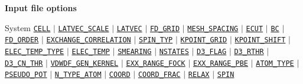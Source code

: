   
  
  \begin{frame}[allowframebreaks]{\textbf{Input file options}} \label{Index}
  \vspace{-2mm}
  \begin{block}{System}
  \hyperlink{CELL}{\texttt{CELL}} $\vert$
  \hyperlink{LATVEC_SCALE}{\texttt{LATVEC\_SCALE}} $\vert$
  \hyperlink{LATVEC}{\texttt{LATVEC}}  $\vert$
  \hyperlink{FD_GRID}{\texttt{FD\_GRID}} $\vert$
  \hyperlink{MESH_SPACING}{\texttt{MESH\_SPACING}} $\vert$
  \hyperlink{ECUT}{\texttt{ECUT}} $\vert$
  \hyperlink{BC}{\texttt{BC}} $\vert$
  \hyperlink{FD_ORDER}{\texttt{FD\_ORDER}} $\vert$
  \hyperlink{EXCHANGE_CORRELATION}{\texttt{EXCHANGE\_CORRELATION}} $\vert$
  \hyperlink{SPIN_TYP}{\texttt{SPIN\_TYP}} $\vert$
  \hyperlink{KPOINT_GRID}{\texttt{KPOINT\_GRID}} $\vert$
  \hyperlink{KPOINT_SHIFT}{\texttt{KPOINT\_SHIFT}} $\vert$
  \hyperlink{ELEC_TEMP_TYPE}{\texttt{ELEC\_TEMP\_TYPE}} $\vert$
  \hyperlink{ELEC_TEMP}{\texttt{ELEC\_TEMP}} $\vert$
  \hyperlink{SMEARING}{\texttt{SMEARING}} $\vert$
  \hyperlink{NSTATES}{\texttt{NSTATES}}     $\vert$
  \hyperlink{D3_FLAG}{\texttt{D3\_FLAG}} $\vert$
  \hyperlink{D3_RTHR}{\texttt{D3\_RTHR}} $\vert$
  \hyperlink{D3_CN_THR}{\texttt{D3\_CN\_THR}} $\vert$
  \hyperlink{VDWDF_GEN_KERNEL}{\texttt{VDWDF\_GEN\_KERNEL}} $\vert$
  \hyperlink{EXX_RANGE_FOCK}{\texttt{EXX\_RANGE\_FOCK}} $\vert$ 
  \hyperlink{EXX_RANGE_PBE}{\texttt{EXX\_RANGE\_PBE}} $\vert$ 
  \hyperlink{ATOM_TYPE}{\texttt{ATOM\_TYPE}} $\vert$
  \hyperlink{PSEUDO_POT}{\texttt{PSEUDO\_POT}}  $\vert$
  \hyperlink{N_TYPE_ATOM}{\texttt{N\_TYPE\_ATOM}} $\vert$
  \hyperlink{COORD}{\texttt{COORD}} $\vert$
  \hyperlink{COORD_FRAC}{\texttt{COORD\_FRAC}} $\vert$
  \hyperlink{RELAX}{\texttt{RELAX}} $\vert$
  \hyperlink{SPIN}{\texttt{SPIN}} 
  \end{block}
  

\end{frame}
